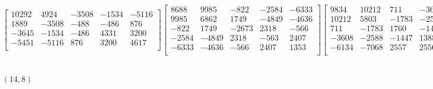 \documentclass[12pt]{amsart}
\theoremstyle{plain}
\theoremstyle{definition}
\begin{document}
\begin{landscape}
\begin{align*}
\begin{bmatrix}
 10292  &   4924  &   -3508  &   -1534  &   -5116  \\ 
 1889  &   -3508  &   -488  &   -486  &   876  \\ 
 -3645  &   -1534  &   -486  &   4331  &   3200  \\ 
 -5451  &   -5116  &   876  &   3200  &   4617  \\ 
\end{bmatrix}
\begin{bmatrix}
8688  &   9985  &   -822  &   -2584  &   -6333  \\ 
 9985  &   6862  &   1749  &   -4849  &   -4636  \\ 
 -822  &   1749  &   -2673  &   2318  &   -566  \\ 
 -2584  &   -4849  &   2318  &   -563  &   2407  \\ 
 -6333  &   -4636  &   -566  &   2407  &   1353  \\ 
\end{bmatrix}
\begin{bmatrix}
9834  &   10212  &   711  &   -3608  &   -6134  \\ 
 10212  &   5803  &   -1783  &   -2588  &   -7068  \\ 
 711  &   -1783  &   1760  &   -1447  &   2557  \\ 
 -3608  &   -2588  &   -1447  &   1388  &   2556  \\ 
 -6134  &   -7068  &   2557  &   2556  &   3813  \\ 
\end{bmatrix}
\begin{bmatrix}
-10922  &   -8424  &   -479  &   4357  &   5643  \\ 
 -8424  &   -9324  &   1130  &   2328  &   5794  \\ 
 -479  &   1130  &   -929  &   612  &   -642  \\ 
 4357  &   2328  &   612  &   -2258  &   -1865  \\ 
 5643  &   5794  &   -642  &   -1865  &   -3789  \\ 
\end{bmatrix}
\\
(14,8) &:
\begin{bmatrix}
1202  &   -543  &   -692  &   4530  &   -2070  \\ 
 -543  &   -2044  &   -3004  &   401  &   4791  \\ 
 -692  &   -3004  &   1839  &   1570  &   -990  \\ 
 4530  &   401  &   1570  &   5718  &   -7276  \\ 

\end{bmatrix}
\end{align*}
\end{landscape}
\end{document}
